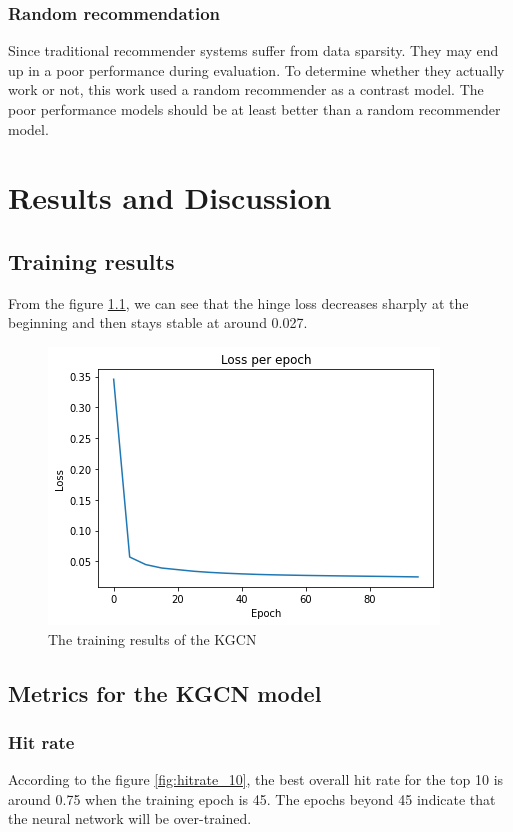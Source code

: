 \documentclass[11pt,twoside]{report}
\begin{document}

\subsection{Random recommendation}
Since traditional recommender systems suffer from data sparsity. They may end up in a poor performance during evaluation. To determine whether they actually work or not, this work used a random recommender as a contrast model. The poor performance models should be at least better than a random recommender model.

\chapter{Results and Discussion}
\section{Training results}
From the figure \ref{fig:training_results}, we can see that the hinge loss decreases sharply at the beginning and then stays stable at around 0.027.

\begin{figure}[H]
    \centering
    \includegraphics[scale=0.9]{training_results.png}
    \caption{The training results of the KGCN}
    \label{fig:training_results}
\end{figure}

\section{Metrics for the KGCN model}
\subsection{Hit rate}
According to the figure \ref{fig:hitrate_10}, the best overall hit rate for the top 10 is around 0.75 when the training epoch is 45. The epochs beyond 45 indicate that the neural network will be over-trained.
\end{document}
